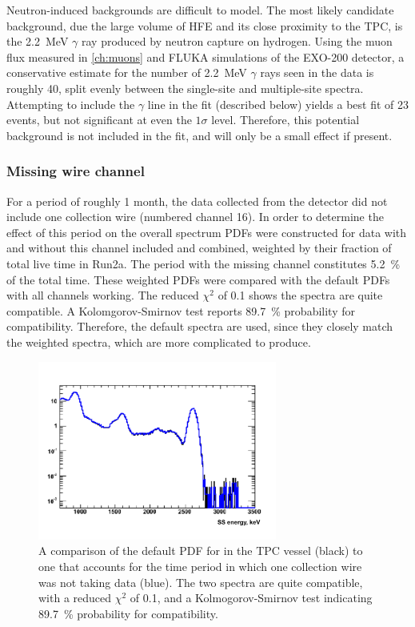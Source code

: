 \documentclass[herrin-thesis.tex]{subfiles}
\begin{document}
Neutron-induced backgrounds are difficult to model. The most likely candidate background, due the large volume of HFE and its close proximity to the TPC, is the \SI{2.2}{\MeV} \(\gamma\) ray produced by neutron capture on hydrogen. Using the muon flux measured in \cref{ch:muons} and FLUKA\cite{Ferrari:2005zk} simulations of the EXO-200 detector, a conservative estimate for the number of \SI{2.2}{\MeV} \(\gamma\) rays seen in the data is roughly 40, split evenly between the single-site and multiple-site spectra. Attempting to include the \(\gamma\) line in the fit (described below) yields a best fit of 23 events, but not significant at even the \(1\sigma\) level. Therefore, this potential background is not included in the fit, and will only be a small effect if present.

\subsubsection{Missing wire channel}
For a period of roughly 1 month, the data collected from the detector did not include one collection wire (numbered channel 16). In order to determine the effect of this period on the overall spectrum PDFs were constructed for data with and without this channel included and combined, weighted by their fraction of total live time in Run2a. The period with the missing channel constitutes \SI{5.2}{\percent} of the total time. These weighted PDFs were compared with the default PDFs with all channels working. The reduced \(\chi^2\) of 0.1 shows the spectra are quite compatible. A Kolomgorov-Smirnov test reports \SI{89.7}{\percent} probability for compatibility. Therefore, the default spectra are used, since they closely match the weighted spectra, which are more complicated to produce.

\begin{figure}[htp]
\centering
\includegraphics[width=0.7\textwidth]{./plots/analysis_missing_channel16_comparison.pdf}
\caption[Comparison of default PDF to PDF with missing channel]{A comparison of the default PDF for  in the TPC vessel (black) to one that accounts for the time period in which one collection wire was not taking data (blue). The two spectra are quite compatible, with a reduced \(\chi^2\) of 0.1, and a Kolmogorov-Smirnov test indicating \SI{89.7}{\percent} probability for compatibility.}
\label{fig:analysis_missing_channel16_comparison}
\end{figure}
\end{document}
